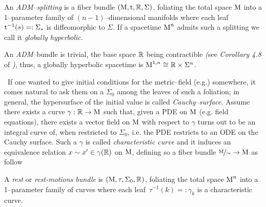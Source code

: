 \begin{defi}\label{ADM}
An \emph{ADM--splitting} is a fiber bundle $(\text{\normalfont M},\text{\normalfont t},\mathbb{R},\Sigma)$, foliating the total space $\text{\normalfont M}$ into a 1--parameter family of $(n-1)$--dimensional manifolds where each leaf \,$\text{\normalfont t}^{-1}(s)=:\Sigma_s$ is diffeomorphic to $\Sigma$. If a spacetime $\text{\normalfont M}^n$ admits such a splitting we call it \emph{globally hyperbolic}.
\end{defi}
\begin{remark}
    An \emph{ADM}--bundle is trivial, the base space $\mathbb{R}$ being contractible \emph{(}see \emph{Corollary 4.8} of \emph{\cite{husemoller})}, thus, a globally hyperbolic spacetime is $\text{\normalfont M}^{1,n}\cong\mathbb{R}\times\Sigma^n$.
\end{remark}
\,\newline
If one wanted to give initial conditions for the metric--field (e.g.) somewhere, it comes natural to ask them on a $\Sigma_0$ among the leaves of such a foliation; in general, the hypersurface of the initial value is called \emph{Cauchy--surface}. Assume there exists a curve $\gamma:\mathbb{R}\to\text{\normalfont M}$ such that, given a PDE on $\text{\normalfont M}$ (e.g. field equations), there exists a vector field on $\text{\normalfont M}$ with respect to $\gamma$ turns out to be an integral curve of, when restricted to $\Sigma_0$, i.e. the PDE restricts to an ODE on the Cauchy surface. Such a $\gamma$ is called \emph{characteristic curve} and it induces an equivalence relation $x\sim x'\in\gamma(\mathbb{R})$ on $\text{\normalfont M}$, defining so a fiber bundle $\nicefrac{\text{\normalfont M}}{\sim}\to\text{\normalfont M}$ as follow 

\begin{defi}
    A \emph{rest} or \emph{rest-motions bundle} is $(\text{\normalfont M},\tau,\Sigma_0,\mathbb{R})$, foliating the total space $\text{\normalfont M}^n$ into a 1--parameter family of curves where each leaf \,$\tau^{-1}(k)=:\gamma_k$ is a characteristic curve.
\end{defi}

